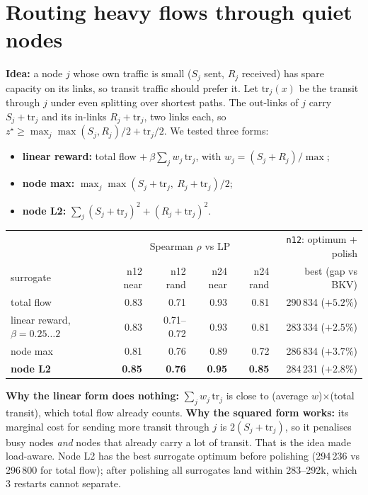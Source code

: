 \documentclass[11pt]{article}
\begin{document}
\section{Routing heavy flows through quiet nodes}
\textbf{Idea:} a node $j$ whose own traffic is small ($S_j$ sent, $R_j$ received) has spare
capacity on its links, so transit traffic should prefer it. Let $\mathrm{tr}_j(x)$ be the
transit through $j$ under even splitting over shortest paths. The out-links of $j$ carry
$S_j+\mathrm{tr}_j$ and its in-links $R_j+\mathrm{tr}_j$, two links each, so
$z^\star\ge \max_j \max(S_j,R_j)/2 + \mathrm{tr}_j/2$. We tested three forms:
\begin{itemize}
\item \textbf{linear reward:} total flow $+\ \beta\sum_j w_j\,\mathrm{tr}_j$, with $w_j=(S_j+R_j)/\max$;
\item \textbf{node max:} $\max_j \max(S_j+\mathrm{tr}_j,\ R_j+\mathrm{tr}_j)/2$;
\item \textbf{node L2:} $\sum_j (S_j+\mathrm{tr}_j)^2+(R_j+\mathrm{tr}_j)^2$.
\end{itemize}
\begin{center}
\begin{tabular}{@{}lrrrrr@{}}
\toprule
& \multicolumn{4}{c}{Spearman $\rho$ vs LP} & \texttt{n12}: optimum + polish\\
surrogate & n12 near & n12 rand & n24 near & n24 rand & best (gap vs BKV)\\
\midrule
total flow & 0.83 & 0.71 & 0.93 & 0.81 & 290\,834 ($+5.2\%$)\\
linear reward, $\beta=0.25\ldots2$ & 0.83 & 0.71--0.72 & 0.93 & 0.81 & 283\,334 ($+2.5\%$)\\
node max & 0.81 & 0.76 & 0.89 & 0.72 & 286\,834 ($+3.7\%$)\\
\textbf{node L2} & \textbf{0.85} & \textbf{0.76} & \textbf{0.95} & \textbf{0.85} & 284\,231 ($+2.8\%$)\\
\bottomrule
\end{tabular}
\end{center}
\textbf{Why the linear form does nothing:} $\sum_j w_j\,\mathrm{tr}_j$ is close to (average
$w$)$\times$(total transit), which total flow already counts. \textbf{Why the squared form
works:} its marginal cost for sending more transit through $j$ is $2(S_j+\mathrm{tr}_j)$,
so it penalises busy nodes \emph{and} nodes that already carry a lot of transit. That is
the idea made load-aware. Node L2 has the best surrogate optimum before polishing (294\,236
vs 296\,800 for total flow); after polishing all surrogates land within
283--292k, which 3 restarts cannot separate.
\end{document}
